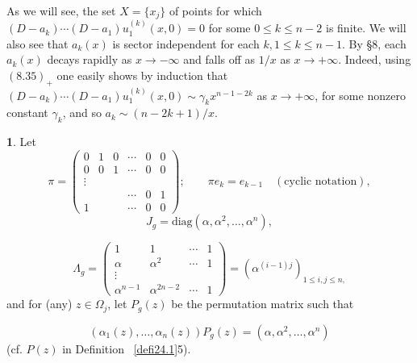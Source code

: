 \documentclass{surv-l}
\theoremstyle{plain}
\theoremstyle{definition}
\newtheorem{definition}[theorem]{\sc{Definition}}
\numberwithin{equation}{chapter}
\begin{document}
As we will see, the set $X = \{x_{j}\}$ of points for which $(D-a_{k})\cdots(D-a_{1})u_{1}^{(k)}(x, 0)=0$ for some $0\leq k\leq n-2$ is finite. We will also see that $a_{k}(x)$ is sector independent for each $k, 1\leq k\leq n-1$. By \S 8, each $a_{k}(x)$ decays rapidly as $ x\rightarrow-\infty$ and falls off as $1/x$ as $ x\rightarrow+\infty$. Indeed, using $(8.35)_{+}$ one easily shows by induction that $(D-a_{k})\cdots(D-a_{1})u_{1}^{(k)}(x,0)\sim\gamma_{k}x^{n-1-2k}$ as  $x\rightarrow+\infty$, for some nonzero constant $\gamma_{k}$, and so $a_{k}\sim(n-2k+1)/x$.
\setcounter{theorem}{21}
\begin{definition}\label{defi38.22}
Let
\setcounter{equation}{22}
\begin{equation}\label{eq38.23}
\pi=\left(\begin{array}{llllll}
0 & 1 & 0 & \cdots & 0 & 0\\
0 & 0 & 1 & \cdots & 0 & 0\\
\vdots & & & & &\\
  &  &  & \cdots & 0 & 1\\
1 &  & & \cdots & 0 & 0
\end{array}\right); \qquad  \pi e_{k}=e_{k-1}\quad (\text{cyclic notation}),
\end{equation}
\begin{equation}\label{eq38.24}
J_{g}=\mathrm{diag}(\alpha,\alpha^{2},\ldots,\alpha^{n}),
\end{equation}

\begin{equation}\label{eq38.25}
\Lambda_{g}=\left(\begin{array}{cccc}
1 & 1 & \cdots   &1  \\
\alpha & \alpha^{2} & \cdots &1\\
\vdots &  &  & \\
\alpha^{n-1} & \alpha^{2n-2} &\cdots  &1
\end{array}\right) =(\alpha^{(i-1)j})_{1\leq i,j\leq n,}
\end{equation}
and for (any) $z\in\Omega_{j}$, let $P_{g}(z)$ be the permutation matrix such that
\end{definition}
\begin{equation}\label{eq38.26}
(\alpha_{1}(z),\ldots,\alpha_{n}(z))P_{g}(z)=(\alpha, \alpha^{2},\ldots,\alpha^{n})
\end{equation}
(cf. $P(z)$ in Definition ~\ref{defi24.1}5).
\end{document}
